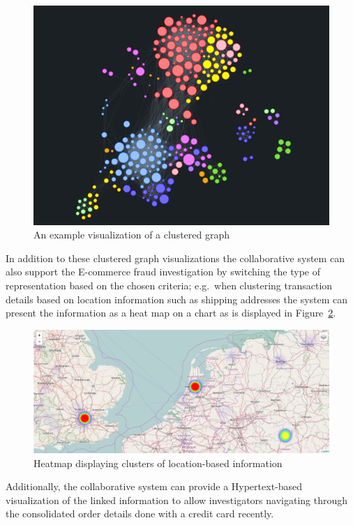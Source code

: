 \begin{figure}[H]
  \centering
  \includegraphics[width=0.9\columnwidth]{images/GraphViz.png}
  \caption[An example visualization of a clustered graph]{An example visualization of a clustered graph \citep{visjsshowcase}}
\label{fig:images_graph_viz}
\end{figure}

 In addition to these clustered graph visualizations the collaborative system can also support the \gls{E-commerce} fraud investigation by switching the type of representation based on the chosen criteria; e.g.\ when clustering transaction details based on location information such as shipping addresses the system can present the information as a heat map on a chart as is displayed in Figure~\ref{fig:images_map_heatmap}. \@

\begin{figure}[H]
  \centering
  \includegraphics[width=0.9\columnwidth]{images/Heatmap.png}
  \caption{Heatmap displaying clusters of location-based information}
\label{fig:images_map_heatmap}
\end{figure}

Additionally, the collaborative system can provide a Hypertext-based visualization of the linked information to allow investigators navigating through the consolidated order details done with a credit card recently. \\

